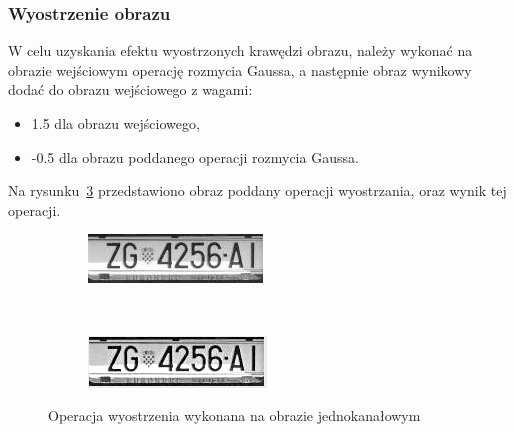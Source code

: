 \subsubsection{Wyostrzenie obrazu}
W celu uzyskania efektu wyostrzonych krawędzi obrazu, należy wykonać na obrazie wejściowym operację rozmycia Gaussa, a następnie obraz wynikowy dodać do obrazu wejściowego z wagami:
\begin{itemize}
  \item 1.5 dla obrazu wejściowego,
  \item -0.5 dla obrazu poddanego operacji rozmycia Gaussa.
\end{itemize}Na rysunku~\ref{fig:image_sharpen} przedstawiono obraz poddany operacji wyostrzania, oraz wynik tej operacji.
\begin{figure}
  \centering
  \begin{subfigure}[b]{0.45\textwidth}
    \includegraphics[width=\textwidth]{img/image-sharpen-before}
    \label{fig:image_sharpen_before}
  \end{subfigure}
  ~
  \begin{subfigure}[b]{0.45\textwidth}
    \includegraphics[width=\textwidth]{img/image-sharpen-after}
    \label{fig:image_sharpen_after}
  \end{subfigure}
  \caption{Operacja wyostrzenia wykonana na obrazie jednokanałowym}
  \label{fig:image_sharpen}
\end{figure}

